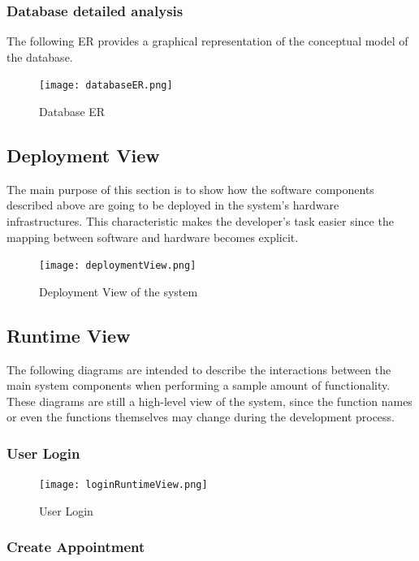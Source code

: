 \documentclass[12pt]{article}
\begin{document}
\subsubsection{Database detailed analysis}
The following ER provides a graphical representation of the conceptual model of the database.

\begin{figure}[H]
    \centering
    \texttt{[image: databaseER.png]}
    \caption{Database ER}
    \label{fig:databaseER}
\end{figure}

\subsection{Deployment View}
The main purpose of this section is to show how the software components described above are going to be deployed in the system's hardware infrastructures. This characteristic makes the developer's task easier since the mapping between software and hardware becomes explicit.

\begin{figure}[H]
    \centering
    \texttt{[image: deploymentView.png]}
    \caption{Deployment View of the system}
    \label{fig:componentView}
\end{figure}


\subsection{Runtime View}
The following diagrams are intended to describe the interactions between the main system components when performing a sample amount of functionality. These diagrams are still a high-level view of the system, since the function names or even the functions themselves may change during the development process.
\subsubsection{User Login}

\begin{figure}[H]
    \centering
    \texttt{[image: loginRuntimeView.png]}
    \caption{User Login}
    \label{fig:loginRuntime}
\end{figure}

\subsubsection{Create Appointment}
\end{document}
